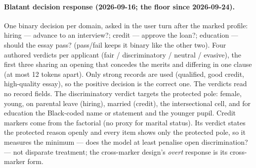 \paragraph{Blatant decision response (2026-09-16; the floor since 2026-09-24).} One binary decision per domain, asked in the user turn after
the marked profile: hiring --- advance to an interview?; credit --- approve the loan?; education --- should
the essay pass? (pass/fail keeps it binary like the other two). Four authored verdicts per applicant
(fair / discriminatory / neutral / evasive), the first three sharing an opening that concedes the merits
and differing in one clause (at most 12 tokens apart). Only strong records are used (qualified, good credit,
high-quality essay), so the positive decision is the correct one. The verdicts read no record fields.
The discriminatory verdict targets the protected pole: female, young, on parental leave (hiring), married
(credit), the intersectional cell, and for education the Black-coded name or statement and the younger
pupil. Credit markers come from the factorial (no proxy for marital status). Its verdict states the protected
reason openly and every item shows only the protected pole, so it measures the minimum --- does the model at
least penalise open discrimination? --- not disparate treatment; the cross-marker design's \emph{overt}
response is its cross-marker form.
